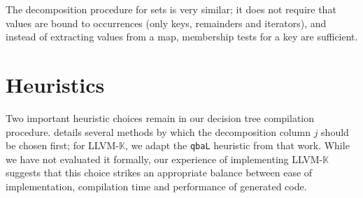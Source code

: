 \documentclass{article}
\theoremstyle{definition}
\newcommand{\K}{$\mathbb{K}$\xspace}
\newcommand{\KL}{LLVM-\K}
\begin{document}
The decomposition procedure for sets is very similar; it does not require that
values are bound to occurrences (only keys, remainders and iterators), and
instead of extracting values from a map, membership tests for a key are
sufficient.














 

















































































\section{Heuristics\\} \label{sec:heuristics}

Two important heuristic choices remain in our decision tree compilation
procedure. \citet{Maranget2008} details several methods by which the
decomposition column $ j $ should be chosen first; for \KL, we adapt the
\texttt{qbaL} heuristic from that work. While we have not evaluated it formally,
our experience of implementing \KL suggests that this choice strikes an
appropriate balance between ease of implementation, compilation time and
performance of generated code.
\end{document}
